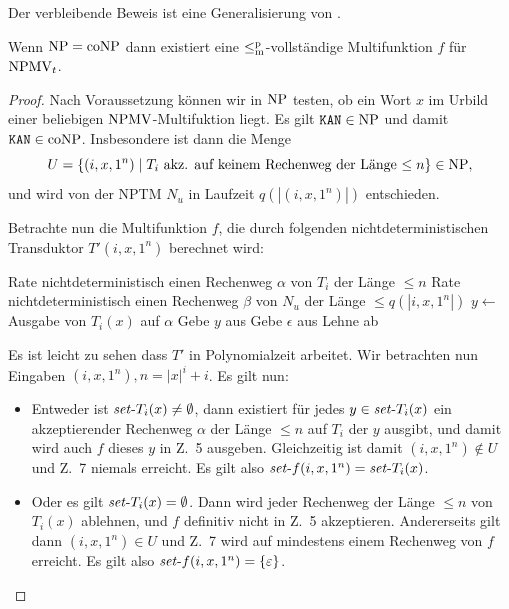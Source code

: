 Der verbleibende Beweis ist eine Generalisierung von \textcite{dingel_separation_2022}.
\begin{theorem}\label{thm:npmvt-vs-npconp}
    Wenn $\mathrm{NP}=\mathrm{coNP}$ dann existiert eine $\leq_\mathrm{m}^\mathrm{p}$-vollständige Multifunktion $f$ für $\mathrm{NPMV}_t$.
\end{theorem}
\begin{proof}
    Nach Voraussetzung können wir in $\mathrm{NP}$ testen, ob ein Wort $x$ im Urbild einer beliebigen $\mathrm{NPMV}$-Multifuktion liegt.
    Es gilt $\mathtt{KAN}\in\mathrm{NP}$ und damit $\mathtt{KAN}\in\mathrm{coNP}$. Insbesondere ist dann die Menge
    \[ U = \{ (i, x, 1^n) \mid T_i \text{ akz. auf keinem Rechenweg der Länge $\leq n$} \} \in\mathrm{NP},  \]
    und wird von der NPTM $N_u$ in Laufzeit $q(|(i, x, 1^n)|)$ entschieden.

    Betrachte nun die Multifunktion $f$, die durch folgenden nichtdeterministischen Transduktor $T'(i, x, 1^n)$ berechnet wird:\\
    \begin{algorithm}[H]
        Rate nichtdeterministisch einen Rechenweg $\alpha$ von $T_i$ der Länge $\leq n$\;
        Rate nichtdeterministisch einen Rechenweg $\beta$ von $N_u$ der Länge $\leq q(|i, x, 1^n|)$\;
        {
            $y\gets $ Ausgabe von $T_i(x)$ auf $\alpha$\;
            Gebe $y$ aus\;
        }
        {
            Gebe $\epsilon$ aus\;
        }
        \Else
        {
            Lehne ab\;
        }
    \end{algorithm}
    Es ist leicht zu sehen dass $T'$ in Polynomialzeit arbeitet. Wir betrachten nun Eingaben $(i, x, 1^n), n={|x|^i+i}$. Es gilt nun:
    \begin{itemize}[nosep]
        \item Entweder ist $\mathit{set}\text{-}{T_i}(x)\neq \emptyset$, dann existiert für jedes $y\in \mathit{set}\text{-}{T_i}(x)$ ein akzeptierender Rechenweg $\alpha$ der Länge $\leq n$ auf $T_i$ der $y$ ausgibt, und damit wird auch $f$ dieses $y$ in Z.~5 ausgeben.
            Gleichzeitig ist damit $(i, x, 1^n)\not\in U$ und Z.~7 niemals erreicht.
            Es gilt also $\mathit{set}\text{-}{f}(i, x, 1^n)=\mathit{set}\text{-}{T_i}(x)$.
        \item Oder es gilt $\mathit{set}\text{-}{T_i}(x)=\emptyset$.
            Dann wird jeder Rechenweg der Länge $\leq n$ von $T_i(x)$ ablehnen, und $f$ definitiv nicht in Z.~5 akzeptieren.
            Andererseits gilt dann $(i, x, 1^n)\in U$ und Z.~7 wird auf mindestens einem Rechenweg von $f$ erreicht.
            Es gilt also $\mathit{set}\text{-}{f}(i, x, 1^n)=\{\varepsilon\}$.
    \end{itemize}


\end{proof}
